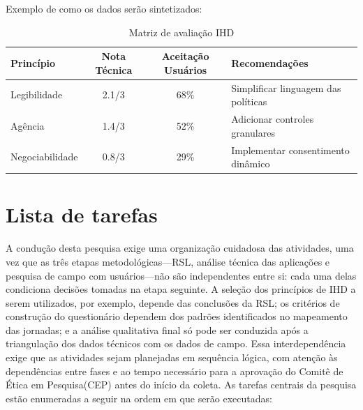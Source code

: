 \documentclass[
	12pt,				%
	oneside,			%
	a4paper,			%
	english,			%
	brazil				%
	]{abntex2ppgsi}
\begin{document}
Exemplo de como os dados serão sintetizados:

\begin{table}[h]
    \centering
    \caption{Matriz de avaliação IHD}
    \label{tab:matriz-hdi-exemplo}
    \begin{tabular}{lccp{4cm}}
        \hline
        \textbf{Princípio} & \textbf{Nota Técnica} & \textbf{Aceitação Usuários} & \textbf{Recomendações} \\ \hline
        Legibilidade & 2.1/3 & 68\% & Simplificar linguagem das políticas \\ \hline
        Agência & 1.4/3 & 52\% & Adicionar controles granulares \\ \hline
        Negociabilidade & 0.8/3 & 29\% & Implementar consentimento dinâmico \\ \hline
    \end{tabular}
\end{table}



  \section{Lista de tarefas}

    A condução desta pesquisa exige uma organização cuidadosa das atividades, uma vez que as três etapas metodológicas---RSL, análise técnica das aplicações e pesquisa de campo com usuários---não são independentes entre si: cada uma delas condiciona decisões tomadas na etapa seguinte. A seleção dos princípios de IHD a serem utilizados, por exemplo, depende das conclusões da RSL; os critérios de construção do questionário dependem dos padrões identificados no mapeamento das jornadas; e a análise qualitativa final só pode ser conduzida após a triangulação dos dados técnicos com os dados de campo. Essa interdependência exige que as atividades sejam planejadas em sequência lógica, com atenção às dependências entre fases e ao tempo necessário para a aprovação do Comitê de Ética em Pesquisa(CEP) antes do início da coleta. As tarefas centrais da pesquisa estão enumeradas a seguir na ordem em que serão executadas:
\end{document}
